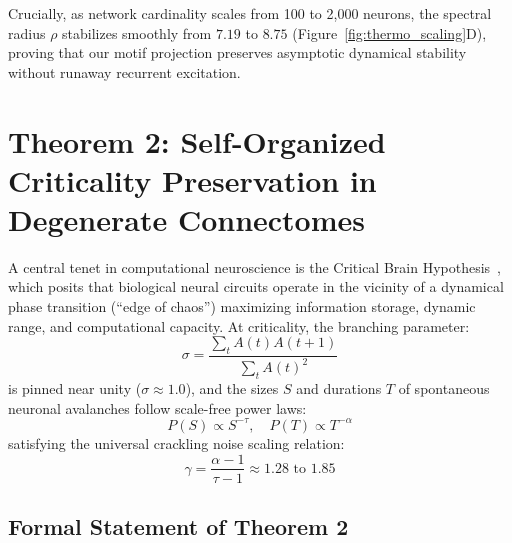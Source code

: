 \documentclass[11pt,letterpaper]{report}
\begin{document}
Crucially, as network cardinality scales from 100 to 2,000 neurons, the spectral radius $\rho$ stabilizes smoothly from $7.19$ to $8.75$ (Figure~\ref{fig:thermo_scaling}D), proving that our motif projection preserves asymptotic dynamical stability without runaway recurrent excitation.

\section{Theorem 2: Self-Organized Criticality Preservation in Degenerate Connectomes}

A central tenet in computational neuroscience is the Critical Brain Hypothesis~\cite{beggs2003neuronal}, which posits that biological neural circuits operate in the vicinity of a dynamical phase transition (``edge of chaos'') maximizing information storage, dynamic range, and computational capacity. At criticality, the branching parameter:
\begin{equation}
\sigma = \frac{\sum_t A(t) A(t+1)}{\sum_t A(t)^2}
\end{equation}
is pinned near unity ($\sigma \approx 1.0$), and the sizes $S$ and durations $T$ of spontaneous neuronal avalanches follow scale-free power laws:
\begin{equation}
P(S) \propto S^{-\tau}, \quad P(T) \propto T^{-\alpha}
\end{equation}
satisfying the universal crackling noise scaling relation:
\begin{equation}
\gamma = \frac{\alpha - 1}{\tau - 1} \approx 1.28 \text{ to } 1.85
\end{equation}

\subsection{Formal Statement of Theorem 2}
\end{document}
